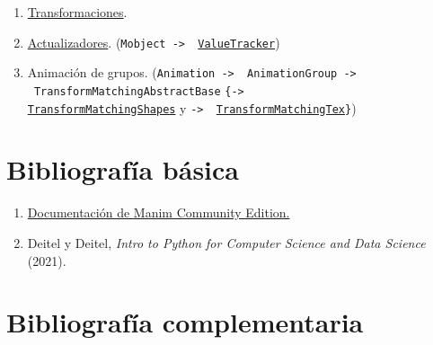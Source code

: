 \documentclass[a4paper]{article}
\begin{document}
\begin{enumerate}

    \item \href{https://docs.manim.community/en/v0.16.0.post0/reference/manim.animation.transform.html#module-manim.animation.transform}{Transformaciones}. 

    \item \href{https://docs.manim.community/en/v0.16.0.post0/reference/manim.animation.updaters.html#module-manim.animation.updaters}{Actualizadores}. (\texttt{Mobject -> \ \href{https://docs.manim.community/en/v0.16.0.post0/reference/manim.mobject.value_tracker.ValueTracker.html?highlight=ValueTracker}{ValueTracker}})

    \item Animación de grupos. (\texttt{Animation -> \ AnimationGroup -> \ TransformMatchingAbstractBase} \texttt{\{-> \\ \href{https://docs.manim.community/en/v0.16.0.post0/reference/manim.animation.transform_matching_parts.TransformMatchingShapes.html?highlight=TransformMatchingShapes}{TransformMatchingShapes}} y \texttt{-> \ \href{https://docs.manim.community/en/v0.16.0.post0/reference/manim.animation.transform_matching_parts.TransformMatchingTex.html?highlight=TransformMatchingTex}{TransformMatchingTex}\}})

\end{enumerate}

\section*{Bibliografía básica} \label{Sec: Bibliografía básica}

\begin{enumerate}

    \item \href{https://docs.manim.community/en/stable/index.html}{Documentación de Manim Community Edition.}


    \item Deitel y Deitel,  \emph{Intro to Python for Computer Science and Data Science} (2021).
\end{enumerate}

\section*{Bibliografía complementaria} \label{Sec: Bibliografía complementaria}
\end{document}
